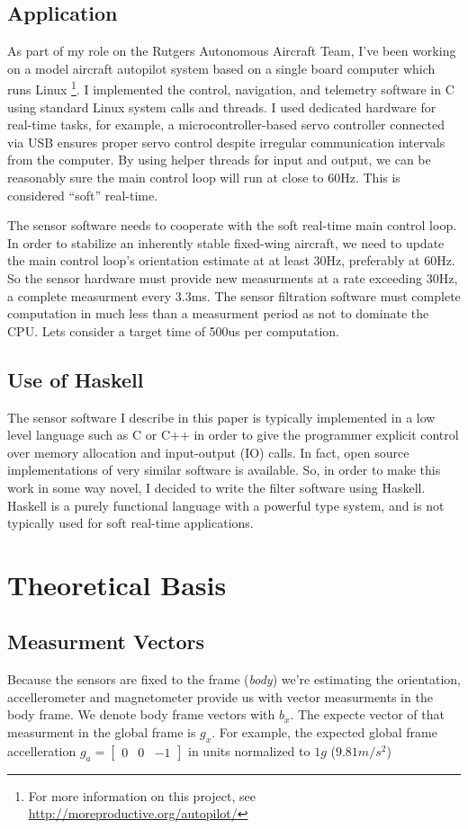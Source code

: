 \documentclass[12pt]{report}
\begin{document}
\subsection{Application}

As part of my role on the Rutgers Autonomous Aircraft Team, I've been working on a model aircraft autopilot system based on a single board computer which runs Linux \footnote{For more information on this project, see \url{http://moreproductive.org/autopilot/}}. I implemented the control, navigation, and telemetry software in C using standard Linux system calls and threads. I used dedicated hardware for real-time tasks, for example, a microcontroller-based servo controller connected via USB ensures proper servo control despite irregular communication intervals from the computer. 
By using helper threads for input and output, we can be reasonably sure the main control loop will run at close to 60Hz. This is considered ``soft'' real-time.

The sensor software needs to cooperate with the soft real-time main control loop. In order to stabilize an inherently stable fixed-wing aircraft, we need to update the main control loop's orientation estimate at at least 30Hz, preferably at 60Hz. So the sensor hardware must provide new measurments at a rate exceeding 30Hz, a complete measurment every 3.3ms. The sensor filtration software must complete computation in much less than a measurment period as not to dominate the CPU. Lets consider a target time of 500us per computation.

\subsection{Use of Haskell}

The sensor software I describe in this paper is typically implemented in a low level language such as C or C++ in order to give the programmer explicit control over memory allocation and input-output (IO) calls. In fact, open source implementations of very similar software is available. So, in order to make this work in some way novel, I decided to write the filter software using Haskell. Haskell is a purely functional language with a powerful type system, and is not typically used for soft real-time applications.

\section{Theoretical Basis}
\subsection{Measurment Vectors}
Because the sensors are fixed to the frame (\emph{body}) we're estimating the orientation, accellerometer and magnetometer provide us with vector measurments in the body frame. We denote body frame vectors with $b_x$. The expecte vector of that measurment in the global frame is $g_x$. For example, the expected global frame accelleration $g_a = \begin{bmatrix} 0 & 0 & -1\end{bmatrix} $ in units normalized to $1g$ ($9.81m/s^2$)
\end{document}
